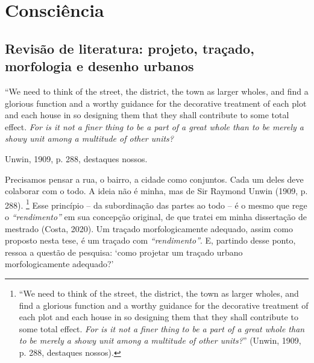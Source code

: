 \documentclass[12pt, a4paper]{book} %
\begin{document}
    
    \part[Consciência]{Consciência}

        \chapter[Revisão de literatura: projeto, traçado, morfologia e desenho urbanos]{Revisão de literatura: projeto, traçado, morfologia e desenho urbanos}

        \epigraph{``We need to think of the street, the district, the town as larger wholes, and find a glorious function and a worthy guidance for the decorative treatment of each plot and each house in so designing them that they shall contribute to some total effect. \textit{For is it not a finer thing to be a part of a great whole than to be merely a showy unit among a multitude of other units?}}{Unwin, 1909, p. 288, destaques nossos.}

        Precisamos pensar a rua, o bairro, a cidade como conjuntos. Cada um deles deve colaborar com o todo. A ideia não é minha, mas de Sir Raymond Unwin (1909, p. 288). 
            \footnote[1]{``We need to think of the street, the district, the town as larger wholes, and find a glorious function and a worthy guidance for the decorative treatment of each plot and each house in so designing them that they shall contribute to some total effect. \textit{For is it not a finer thing to be a part of a great whole than to be merely a showy unit among a multitude of other units?}'' (Unwin, 1909, p. 288, destaques nossos).}
        Esse princípio – da subordinação das partes ao todo – é o mesmo que rege o \textit{``rendimento''} em sua concepção original, de que tratei em minha dissertação de mestrado (Costa, 2020). Um traçado morfologicamente adequado, assim como proposto nesta tese, é um traçado com \textit{``rendimento''}. E, partindo desse ponto, ressoa a questão de pesquisa: `como projetar um traçado urbano morfologicamente adequado?'
\end{document}
